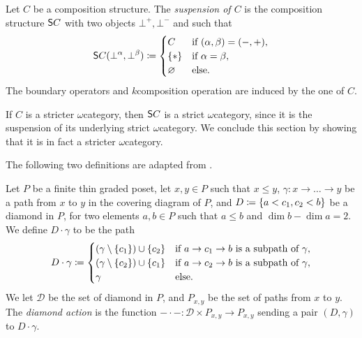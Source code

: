 \begin{dfn} [Suspension]
    Let \( C \) be a composition structure.
    The \emph{suspension of \( C \)} is the composition structure \( \mathsf{S}{C} \) with two objects \( \bot^+, \bot^- \) and such that
    \begin{equation*}
        \mathsf{S}{C}(\bot^\alpha, \bot^\beta) \coloneqq 
        \begin{cases}
            C       & \text{if } (\alpha, \beta) = (-, +),\\
            \left\{ {*} \right\} & \text{if } \alpha = \beta,\\
            \varnothing & \text{else.}
        \end{cases}
    \end{equation*}
    The boundary operators and \( k \)\nbd composition operation are induced by the one of \( C \). 
\end{dfn}

\noindent If \( C \) is a stricter \( \omega \)\nbd category, then \( \mathsf{S}{C} \) is a strict \( \omega \)\nbd category, since it is the suspension of its underlying strict \( \omega \)\nbd category.
We conclude this section by showing that it is in fact a stricter \( \omega \)\nbd category. 

The following two definitions are adapted from \cite{chandler2019thin}.
\begin{dfn} 
    Let \( P \) be a finite thin graded poset, let \( x, y \in P \) such that \( x \le y \), \( \gamma \colon x \to \ldots \to y \) be a path from \( x \) to \( y \) in the covering diagram of \( P \), and \( D \coloneqq \left\{ {a < c_1, c_2 < b} \right\} \) be a diamond in \( P \), for two elements \( a, b \in P \) such that \( a \le b \) and \( \dim b - \dim a = 2 \).
    We define \( D\cdot \gamma \) to be the path
    \begin{equation*}
        D \cdot \gamma \coloneqq 
        \begin{cases}
            (\gamma \setminus \left\{ {c_1} \right\}) \cup \left\{ {c_2} \right\} & \text{if } a \to c_1 \to b \text{ is a subpath of } \gamma, \\
            (\gamma \setminus \left\{ {c_2} \right\}) \cup \left\{ {c_1} \right\} & \text{if } a \to c_2 \to b \text{ is a subpath of } \gamma, \\
            \gamma & \text{else.}
        \end{cases}
    \end{equation*} 
    We let \( \mathcal{D} \) be the set of diamond in \( P \), and \( P_{x, y} \) be the set of paths from \( x \) to \( y \).
    The \emph{diamond action} is the function \( - \cdot - \colon \mathcal{D} \times P_{x, y} \to P_{x, y} \) sending a pair \( (D, \gamma) \) to \( D \cdot \gamma \).
\end{dfn}

